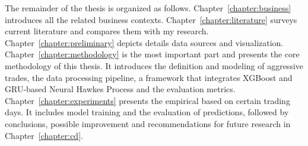 The remainder of the thesis is organized as follows. Chapter~\ref{chapter:business} introduces all the related business contexts. Chapter~\ref{chapter:literature} surveys current literature and compares them with my research. Chapter~\ref{chapter:preliminary} depicts details data sources and visualization. Chapter~\ref{chapter:methodology} is the most important part and presents the core methodology of this thesis. It introduces the definition and modeling of aggressive trades, the data processing pipeline, a framework that integrates XGBoost and GRU-based Neural Hawkes Process and the evaluation metrics. Chapter~\ref{chapter:experiments} presents the empirical based on certain trading days. It includes model training and the evaluation of predictions, followed by conclusions, possible improvement and recommendations for future research in Chapter~\ref{chapter:cd}.
